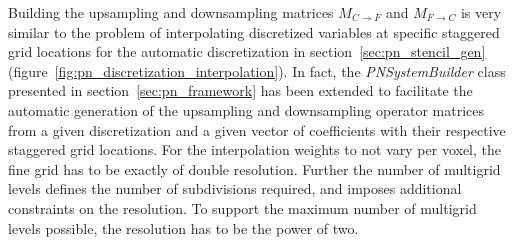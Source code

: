Building the upsampling and downsampling matrices $M_{C\rightarrow F}$ and $M_{F\rightarrow C}$ is very similar to the problem of interpolating discretized variables at specific staggered grid locations for the automatic discretization in section~\ref{sec:pn_stencil_gen} (figure~\ref{fig:pn_discretization_interpolation}). In fact, the \emph{PNSystemBuilder} class presented in section~\ref{sec:pn_framework} has been extended to facilitate the automatic generation of the upsampling and downsampling operator matrices from a given discretization and a given vector of coefficients with their respective staggered grid locations. For the interpolation weights to not vary per voxel, the fine grid has to be exactly of double resolution. Further the number of multigrid levels defines the number of subdivisions required, and imposes additional constraints on the resolution. To support the maximum number of multigrid levels possible, the resolution has to be the power of two.

